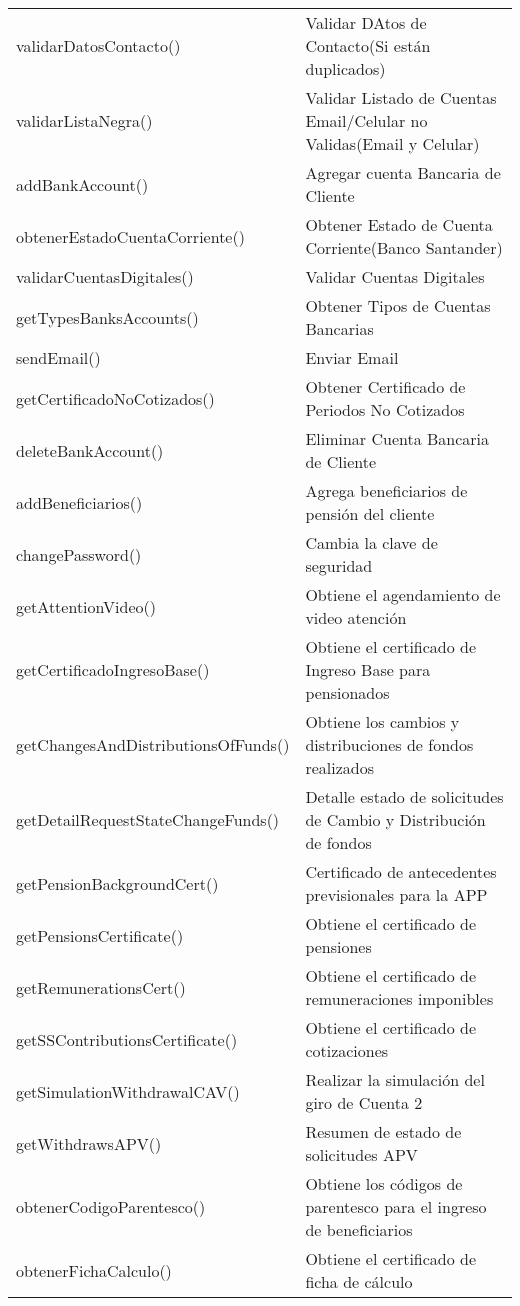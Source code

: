 \begin{tabular}{|p{6cm}|p{8cm}|}
    validarDatosContacto() & Validar DAtos de Contacto(Si están duplicados) \\
    validarListaNegra() & Validar Listado de Cuentas Email/Celular no Validas(Email y Celular) \\
    addBankAccount() & Agregar cuenta Bancaria de Cliente \\
    obtenerEstadoCuentaCorriente() & Obtener Estado de Cuenta Corriente(Banco Santander) \\
    validarCuentasDigitales() & Validar Cuentas Digitales \\
    getTypesBanksAccounts() & Obtener Tipos de Cuentas Bancarias \\
    sendEmail() & Enviar Email \\
    getCertificadoNoCotizados() & Obtener Certificado de Periodos No Cotizados \\
    deleteBankAccount() & Eliminar Cuenta Bancaria de Cliente \\
    addBeneficiarios() & Agrega beneficiarios de pensión del cliente \\
    changePassword() & Cambia la clave de seguridad \\
    getAttentionVideo() & Obtiene el agendamiento de video atención \\ 
    getCertificadoIngresoBase() & Obtiene el certificado de Ingreso Base para pensionados \\
    getChangesAndDistributionsOfFunds() &	Obtiene los cambios y distribuciones de fondos realizados \\
    getDetailRequestStateChangeFunds() &	Detalle estado de solicitudes de Cambio y Distribución de fondos \\
    getPensionBackgroundCert() &	Certificado de antecedentes previsionales para la APP \\
    getPensionsCertificate() &	Obtiene el certificado de pensiones \\
    getRemunerationsCert() &	Obtiene el certificado de remuneraciones imponibles \\
    getSSContributionsCertificate() &	Obtiene el certificado de cotizaciones \\
    getSimulationWithdrawalCAV() &	Realizar la simulación del giro de Cuenta 2 \\
    getWithdrawsAPV() &	Resumen de estado de solicitudes APV \\
    obtenerCodigoParentesco() &	Obtiene los códigos de parentesco para el ingreso de beneficiarios \\
    obtenerFichaCalculo() &	Obtiene el certificado de ficha de cálculo \\

\end{tabular}
